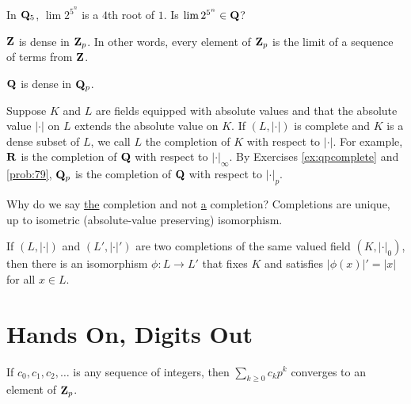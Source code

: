 \begin{prob}\label{prob:77andahalf} In $\mathbf{Q}_5$, $\lim 2^{5^n}$ is a $4$th root of $1$. Is $\lim 2^{5^n} \in \mathbf{Q}$?
\end{prob}

\begin{prob}\label{prob:78} $\mathbf{Z}$ is \textsf{dense} in $\mathbf{Z}_p$. In other words, every element of $\mathbf{Z}_p$ is the limit of a sequence of terms from $\mathbf{Z}$.
\end{prob}

\begin{prob}\label{prob:79} $\mathbf{Q}$ is dense in $\mathbf{Q}_p$.
\end{prob}

Suppose $K$ and $L$ are fields equipped with absolute values and that the absolute value $|\cdot|$ on $L$ extends the absolute value on $K$. If $(L,|\cdot|)$ is complete and $K$ is a dense subset of $L$, we call $L$ the \textsf{completion of $K$ with respect to $|\cdot|$}. For example, $\mathbf{R}$ is the completion of $\mathbf{Q}$ with respect to $|\cdot|_{\infty}$. By Exercises \ref{ex:qpcomplete} and \ref{prob:79}, $\mathbf{Q}_p$ is the completion of $\mathbf{Q}$ with respect to $|\cdot|_p$. 

Why do we say \underline{the} completion and not \underline{a} completion? Completions are unique, up to isometric (absolute-value preserving) isomorphism. 

\begin{prob}\label{prob:80} If $(L,|\cdot|)$ and $(L',|\cdot|')$ are two completions of the same valued field $(K,|\cdot|_0)$, then there is an isomorphism $\phi\colon L \to L'$ that fixes $K$ and satisfies $|\phi(x)|' = |x|$ for all $x \in L$.
\end{prob}


\section*{Hands On, Digits Out}

\begin{prob}\label{prob:81} If $c_0, c_1, c_2, \dots$ is any sequence of integers, then $\sum_{k\ge 0} c_k p^k$ converges to an element of $\mathbf{Z}_p$.
\end{prob}

